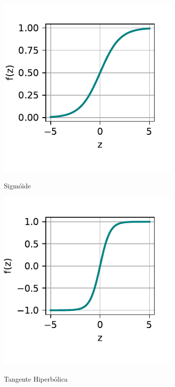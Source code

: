 \begin{figure}[h!]
    \centering
    \caption{Exemplos de funções de ativação de um neurônio para uma Rede Neural.}
    \begin{subfigure}[H]{.4\textwidth}
        \centering
        \caption{Sigmóide}
        \includegraphics[scale=0.8]{img/img-fundamentacao-sig.pdf}
        \label{fig:fund-funcs-sig}
    \end{subfigure}
    \begin{subfigure}[H]{.4\textwidth}
        \centering
        \caption{Tangente Hiperbólica}
        \includegraphics[scale=0.8]{img/img-fundamentacao-tanh.pdf}
        \label{fig:fund-funcs-tanh}
    \end{subfigure}
    \begin{subfigure}[H]{.4\textwidth}

\end{subfigure}
\end{figure}
